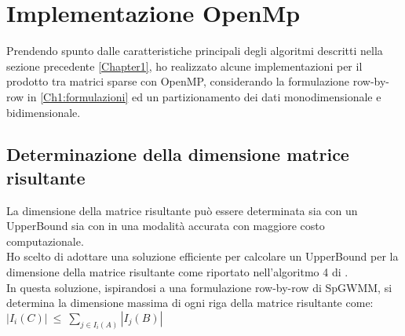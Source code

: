 \chapter{Implementazione OpenMp}
\label{Chapter2} %

Prendendo spunto dalle caratteristiche principali degli algoritmi descritti
nella sezione precedente \ref{Chapter1}, 
ho realizzato alcune implementazioni per il prodotto tra matrici sparse con OpenMP,
considerando la formulazione row-by-row in \ref{Ch1:formulazioni} 
ed un partizionamento dei dati monodimensionale e bidimensionale.\\ 

\section{Determinazione della dimensione matrice risultante} \label{ch2:outSizeUB}
La dimensione della matrice risultante può essere determinata sia con un
UpperBound sia con in una modalità accurata con maggiore costo computazionale.\\
Ho scelto di adottare una soluzione efficiente per calcolare un UpperBound per la
dimensione della matrice risultante come riportato nell'algoritmo 4 di \parencite{sysReviewChi}.\\
In questa soluzione, ispirandosi a una formulazione row-by-row di SpGWMM, 
si determina la dimensione massima di ogni riga della matrice risultante come:\\
$ | I_i(C) |~\leq~\sum\limits_{ j \in I_i(A) }  | I_j(B) | $ 

